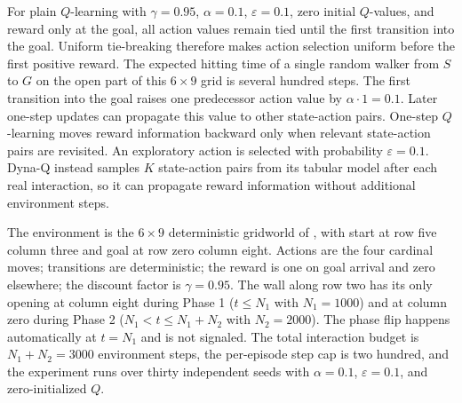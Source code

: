 For plain $Q$-learning with $\gamma = 0.95$, $\alpha = 0.1$, $\varepsilon = 0.1$, zero initial $Q$-values, and reward only at the goal, all action values remain tied until the first transition into the goal. Uniform tie-breaking therefore makes action selection uniform before the first positive reward. The expected hitting time of a single random walker from $S$ to $G$ on the open part of this $6 \times 9$ grid is several hundred steps. The first transition into the goal raises one predecessor action value by $\alpha \cdot 1 = 0.1$. Later one-step updates can propagate this value to other state-action pairs. One-step $Q$-learning moves reward information backward only when relevant state-action pairs are revisited. An exploratory action is selected with probability $\varepsilon = 0.1$. Dyna-Q instead samples $K$ state-action pairs from its tabular model after each real interaction, so it can propagate reward information without additional environment steps.

The environment is the $6 \times 9$ deterministic gridworld of \citet{sutton2018}, with start at row five column three and goal at row zero column eight. Actions are the four cardinal moves; transitions are deterministic; the reward is one on goal arrival and zero elsewhere; the discount factor is $\gamma = 0.95$. The wall along row two has its only opening at column eight during Phase 1 ($t \le N_1$ with $N_1 = 1000$) and at column zero during Phase 2 ($N_1 < t \le N_1 + N_2$ with $N_2 = 2000$). The phase flip happens automatically at $t = N_1$ and is not signaled. The total interaction budget is $N_1 + N_2 = 3000$ environment steps, the per-episode step cap is two hundred, and the experiment runs over thirty independent seeds with $\alpha = 0.1$, $\varepsilon = 0.1$, and zero-initialized $Q$.

